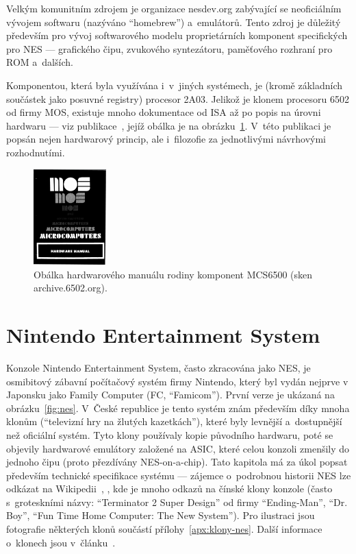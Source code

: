 Velkým komunitním zdrojem je organizace nesdev.org zabývající se neoficiálním vývojem softwaru (nazýváno \enquote{homebrew}) a~emulátorů. Tento zdroj je důležitý především pro vývoj softwarového modelu proprietárních komponent specifických pro NES --- grafického čipu, zvukového syntezátoru, paměťového rozhraní pro ROM a~dalších.

Komponentou, která byla využívána i~v~jiných systémech, je (kromě základních součástek jako posuvné registry) procesor 2A03. Jelikož je klonem procesoru 6502 od firmy MOS, existuje mnoho dokumentace od ISA až po popis na úrovni hardwaru --- viz publikace~\cite{mos:hw-manual}, jejíž obálka je na obrázku~\ref{fig:mos-hw-manual}. V~této publikaci je popsán nejen hardwarový princip, ale i~filozofie za jednotlivými návrhovými rozhodnutími.

\begin{figure}[ht!]
	\centering
	\includegraphics[width=0.25\textwidth]{images/mos-hw-manual.png}
	\caption{Obálka hardwarového manuálu rodiny komponent MCS6500 (sken archive.6502.org).}
	\label{fig:mos-hw-manual}
\end{figure}

\section{Nintendo Entertainment System}
Konzole Nintendo Entertainment System, často zkracována jako NES, je osmibitový zábavní počítačový systém firmy Nintendo, který byl vydán nejprve v Japonsku jako Family Computer (FC, \enquote{Famicom}). První verze je ukázaná na obrázku~\ref{fig:nes}. V~České republice je tento systém znám především díky mnoha klonům (\enquote{televizní hry na žlutých kazetkách}), které byly levnější a~dostupnější než oficiální systém. Tyto klony používaly kopie původního hardwaru, poté se objevily hardwarové emulátory založené na ASIC, které celou konzoli zmenšily do jednoho čipu (proto přezdívány NES-on-a-chip). Tato kapitola má za úkol popsat především technické specifikace systému --- zájemce o~podrobnou historii NES lze odkázat na Wikipedii~\cite{Wikipedia:NES}, \cite{Wikipedia:famiclone}, kde je mnoho odkazů na čínské klony konzole (často s~groteskními názvy: \enquote{Terminator 2 Super Design} od firmy \enquote{Ending-Man}, \enquote{Dr. Boy}, \enquote{Fun Time Home Computer: The New System}). Pro ilustraci jsou fotografie některých klonů součástí přílohy~\ref{apx:klony-nes}. Další informace o~klonech jsou v~článku~\cite{Svara:polystation}.


